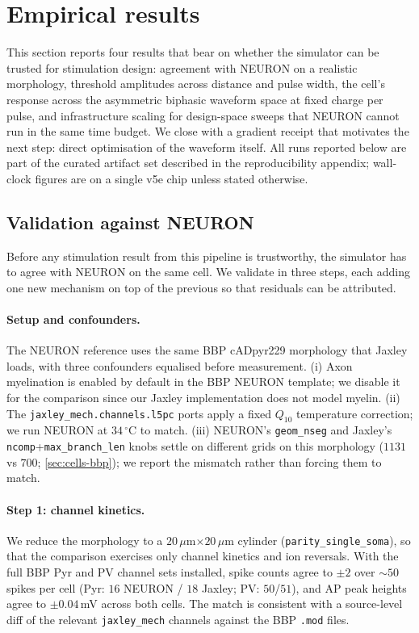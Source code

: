 \section{Empirical results}\label{sec:results-empirical}

This section reports four results that bear on whether the simulator
can be trusted for stimulation design: agreement with NEURON on a
realistic morphology, threshold amplitudes across distance and pulse
width, the cell's response across the asymmetric biphasic waveform
space at fixed charge per pulse, and infrastructure scaling for
design-space sweeps that NEURON cannot run in the same time budget.
We close with a gradient receipt that motivates the next step:
direct optimisation of the waveform itself. All runs reported below are part
of the curated artifact set described in the reproducibility appendix;
wall-clock figures are on a single v5e chip unless stated otherwise.

\subsection{Validation against NEURON}\label{sec:res-neuron}

Before any stimulation result from this pipeline is trustworthy, the
simulator has to agree with NEURON on the same cell. We validate in
three steps, each adding one new mechanism on top of the previous so
that residuals can be attributed.

\paragraph{Setup and confounders.}
The NEURON reference uses the same BBP cADpyr229 morphology that
Jaxley loads, with three confounders equalised before measurement.
(i) Axon myelination is enabled by default in the BBP NEURON template;
we disable it for the comparison since our Jaxley implementation does
not model myelin. (ii) The \texttt{jaxley\_mech.channels.l5pc} ports
apply a fixed $Q_{10}$ temperature correction; we run NEURON at
$34\,^\circ$C to match. (iii) NEURON's \texttt{geom\_nseg} and Jaxley's
\texttt{ncomp}+\texttt{max\_branch\_len} knobs settle on different
grids on this morphology ($1131$ vs $700$; \cref{sec:cells-bbp}); we
report the mismatch rather than forcing them to match.

\paragraph{Step 1: channel kinetics.} We reduce the morphology to a
$20\,\mu$m$\times 20\,\mu$m cylinder (\texttt{parity\_single\_soma}),
so that the comparison exercises only channel kinetics and ion
reversals. With the full BBP Pyr and PV channel sets installed, spike
counts agree to $\pm 2$ over $\sim\!50$ spikes per cell (Pyr: $16$
NEURON / $18$ Jaxley; PV: $50$/$51$), and AP peak heights agree to
$\pm 0.04\,$mV across both cells. The match is consistent with a
source-level diff of the relevant \texttt{jaxley\_mech} channels
against the BBP \texttt{.mod} files.

